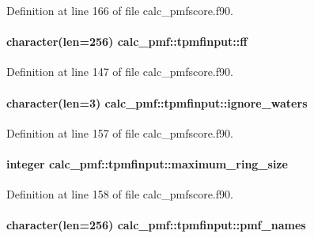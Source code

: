 Definition at line 166 of file calc\-\_\-pmfscore.\-f90.

\hypertarget{structcalc__pmf_1_1tpmfinput_abcff6d17f6b26bfdb54cadeb55a7abe5}{
\paragraph[{ff}]{\setlength{\rightskip}{0pt plus 5cm}character(len=256) calc\-\_\-pmf\-::tpmfinput\-::ff}}\label{structcalc__pmf_1_1tpmfinput_abcff6d17f6b26bfdb54cadeb55a7abe5}


Definition at line 147 of file calc\-\_\-pmfscore.\-f90.

\hypertarget{structcalc__pmf_1_1tpmfinput_a93111194c92ec05302177ba26e3bdbc6}{
\paragraph[{ignore\-\_\-waters}]{\setlength{\rightskip}{0pt plus 5cm}character(len=3) calc\-\_\-pmf\-::tpmfinput\-::ignore\-\_\-waters}}\label{structcalc__pmf_1_1tpmfinput_a93111194c92ec05302177ba26e3bdbc6}


Definition at line 157 of file calc\-\_\-pmfscore.\-f90.

\hypertarget{structcalc__pmf_1_1tpmfinput_ab2687fd07fe27d6e6f38ca8166a911ea}{
\paragraph[{maximum\-\_\-ring\-\_\-size}]{\setlength{\rightskip}{0pt plus 5cm}integer calc\-\_\-pmf\-::tpmfinput\-::maximum\-\_\-ring\-\_\-size}}\label{structcalc__pmf_1_1tpmfinput_ab2687fd07fe27d6e6f38ca8166a911ea}


Definition at line 158 of file calc\-\_\-pmfscore.\-f90.

\hypertarget{structcalc__pmf_1_1tpmfinput_a1cc73a339edd22ce5fc0ac74f516609d}{
\paragraph[{pmf\-\_\-names}]{\setlength{\rightskip}{0pt plus 5cm}character(len=256) calc\-\_\-pmf\-::tpmfinput\-::pmf\-\_\-names}}\label{structcalc__pmf_1_1tpmfinput_a1cc73a339edd22ce5fc0ac74f516609d}


